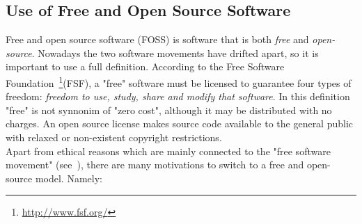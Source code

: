 \documentclass[11pt]{article} %
\begin{document}
\subsection{Use of Free and Open Source Software}\label{foss}
Free and open source software (FOSS) is software that is both \emph{free} and \emph{open-source}. Nowadays the two software movements have drifted apart, so it is important to use a full definition. According to the Free Software Foundation~\footnote{\url{http://www.fsf.org/}}(FSF), a "free" software must be licensed to guarantee four types of freedom: \emph{freedom to use, study, share and modify that software}. In this definition "free" is not synnonim of "zero cost", although it may be distributed with no charges. An open source license makes source code available to the general public with relaxed or non-existent copyright restrictions.\\
Apart from ethical reasons which are mainly connected to the "free software movement" (see~\cite{free}), there are many motivations to switch to a free and open-source model. Namely:%
\end{document}
